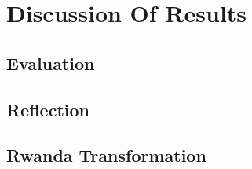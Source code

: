 \chapter{Discussion Of Results}

\section{Evaluation}


\section{Reflection}



\section{Rwanda Transformation}
